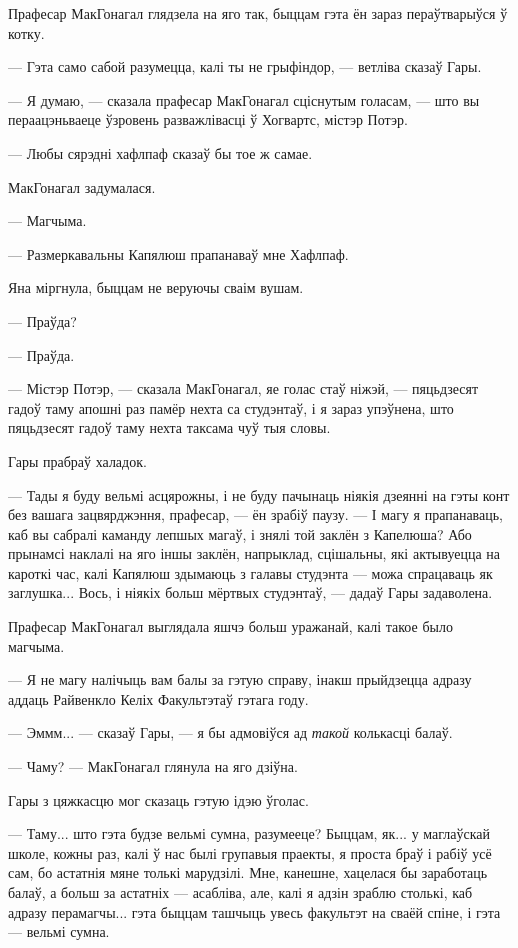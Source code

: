 Прафесар МакГонагал глядзела на яго так, быццам гэта ён зараз пераўтварыўся ў котку.

--- Гэта само сабой разумецца, калі ты не грыфіндор, --- ветліва сказаў Гары.

--- Я думаю, --- сказала прафесар МакГонагал сціснутым голасам, --- што вы 
пераацэньваеце ўзровень разважлівасці ў Хогвартс, містэр Потэр.

--- Любы сярэдні хафлпаф сказаў бы тое ж самае.

МакГонагал задумалася.

--- Магчыма.

--- Размеркавальны Капялюш прапанаваў мне Хафлпаф.

Яна міргнула, быццам не веруючы сваім вушам. 

--- Праўда?

--- Праўда.

--- Містэр Потэр, --- сказала МакГонагал, яе голас стаў ніжэй, --- пяцьдзесят 
гадоў таму апошні раз памёр нехта са студэнтаў, і я зараз упэўнена, што пяцьдзесят 
гадоў таму нехта таксама чуў тыя словы.

Гары прабраў халадок.

--- Тады я буду вельмі асцярожны, і не буду пачынаць ніякія дзеянні на гэты конт без 
вашага зацвярджэння, прафесар, --- ён зрабіў паузу. --- І магу я прапанаваць,
каб вы сабралі каманду лепшых магаў, і знялі той заклён з Капелюша? Або прынамсі
наклалі на яго іншы заклён, напрыклад, сцішальны, які актывуецца на кароткі час, калі
Капялюш здымаюць з галавы студэнта --- можа спрацаваць як заглушка... Вось, і ніякіх
больш мёртвых студэнтаў, --- дадаў Гары задаволена.

Прафесар МакГонагал выглядала яшчэ больш уражанай, калі такое было магчыма.

--- Я не магу налічыць вам балы за гэтую справу, інакш прыйдзецца адразу аддаць Райвенкло
Келіх Факультэтаў гэтага году. 

--- Эммм... --- сказаў Гары, --- я бы адмовіўся ад  \emph{такой} колькасці балаў.

--- Чаму? --- МакГонагал глянула на яго дзіўна.

Гары з цяжкасцю мог сказаць гэтую ідэю ўголас.

--- Таму... што гэта будзе вельмі сумна, разумееце? Быццам, як... у маглаўскай школе,
кожны раз, калі ў нас былі групавыя праекты, я проста браў і рабіў усё сам, бо астатнія
мяне толькі марудзілі. Мне, канешне, хацелася бы заработаць балаў, а больш за астатніх ---
асабліва, але, калі я адзін зраблю столькі, каб адразу перамагчы... гэта быццам 
ташчыць увесь факультэт на сваёй спіне, і гэта --- вельмі сумна.

